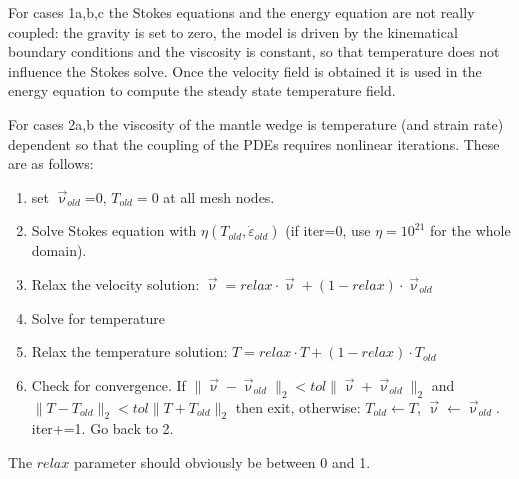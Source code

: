 For cases 1a,b,c the Stokes equations and the energy equation are not really coupled: the gravity is set to zero, the 
model is driven by the kinematical boundary conditions and the viscosity is constant, so that temperature does not 
influence the Stokes solve. Once the velocity field is obtained it is used in the energy equation to compute the 
steady state temperature field. 

For cases 2a,b the viscosity of the mantle 
wedge is temperature (and strain rate) dependent so that the coupling of the PDEs 
requires nonlinear iterations. These are as follows:
\begin{enumerate}
\item set $\vec{\upnu}_{old}$=0, $T_{old}=0$ at all mesh nodes.
\item Solve Stokes equation with $\eta(T_{old},\dot{\varepsilon}_{old})$ (if iter=0, use $\eta=10^{21}$ for the whole domain).
\item Relax the velocity solution: $\vec\upnu = relax \cdot \vec{\upnu} + (1-relax)\cdot \vec{\upnu}_{old}$
\item Solve for temperature 
\item Relax the temperature solution: $T=relax \cdot T + (1-relax) \cdot T_{old}$
\item Check for convergence. If $\|\vec\upnu-\vec\upnu_{old}\|_2 < tol \| \vec\upnu + \vec\upnu_{old}  \|_2$ and 
$\|T-T_{old}\|_2 < tol \| T + T_{old}  \|_2$ then exit, otherwise: $T_{old} \leftarrow T$, $ \vec\upnu \leftarrow \vec\upnu_{old} $. iter+=1. Go back to 2. 
\end{enumerate}

The $relax$ parameter should obviously be between 0 and 1. 


